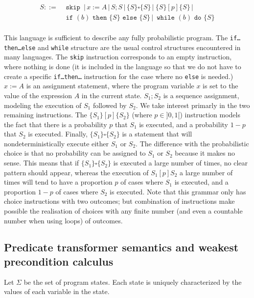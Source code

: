 \documentclass[a4paper,10pt]{llncs}
\begin{document}
\begin{align*}
 S ::= & \texttt{ skip } \,|\, x := A \,|\, S;S  \,|\, \{S\} \square \{S\} \,|\ \{S\} [p] \{S\} \,|\ \\
 & \texttt{ if } (b) \texttt{ then } \{ S \} \texttt{ else } \{ S \} \,|\, \texttt{ while }(b) \texttt{ do }\{S\} \\
\end{align*}

This language is sufficient to describe any fully probabilistic program. The \texttt{if\dots then\dots else} and \texttt{while} structure are the usual control structures encountered in many languages. The \texttt{skip} instruction corresponds to an empty instruction, where nothing is done (it is included in the language so that we do not have to create a specific \texttt{if\dots then\dots} instruction for the case where no \texttt{else} is needed.) $x := A$ is an assignment statement, where the program variable $x$ is set to the value of the expression $A$ in the current state. $S_1 ; S_2$ is a sequence assignment, modeling the execution of $S_1$ followed by $S_2$. We take interest primarly in the two remaining instructions.\newline
The $\{S_1\} [p] \{S_2\}$ (where $p \in ]0,1[$) instruction models the fact that there is a probability $p$ that $S_1$ is executed, and a probability $1-p$ that $S_2$ is executed. Finally, $\{S_1\} \square \{S_2\} $ is a statement that will nondeterministically execute either $S_1$ or $S_2$. The difference with the probabilistic choice is that no probability can be assigned to $S_1$ or $S_2$ because it makes no sense. This means that if $\{S_1\} \square \{S_2\} $ is executed a large number of times, no clear pattern should appear, whereas the execution of $S_1 [p] S_2$ a large number of times will tend to have a proportion $p$ of cases where $S_1$ is executed, and a proportion $1-p$ of cases where $S_2$ is executed.\newline
Note that this grammar only has choice instructions with two outcomes; but combination of instructions make possible the realisation of choices with any finite number (and even a countable number when using loops) of outcomes.\bigskip

	\subsection{Predicate transformer semantics and weakest precondition calculus}
	Let $\Sigma$ be the set of program states. Each state is uniquely characterized by the values of each variable in the state.\bigskip
	
\end{document}
